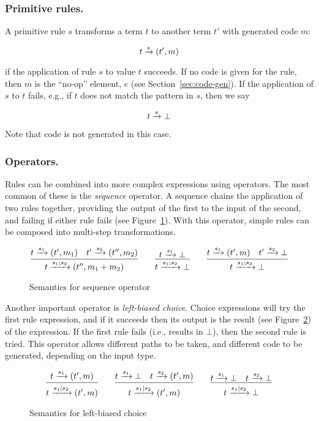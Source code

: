 \subsubsection{Primitive rules.}

A primitive rule $s$ transforms a term $t$ to another term $t'$ with generated code $m$:

\[
t \xrightarrow{s} (t',m)
\]

if the application of rule $s$ to value $t$ succeeds. If no code is given for the rule, then $m$ is the ``no-op'' element, $e$ (see Section~\ref{sec:code-gen}). If the application of $s$ to $t$ fails, e.g., if $t$ does not match the pattern in $s$, then we say

\[
t \xrightarrow{s} \bot
\]

Note that code is not generated in this case.

\subsubsection{Operators.}

Rules can be combined into more complex expressions using operators. The most common of these is the \emph{sequence} operator. A sequence chains the application of two rules together, providing the output of the first to the input of the second, and failing if either rule fails (see Figure~\ref{semantics:sequence}). With this operator, simple rules can be composed into multi-step transformations.

\begin{figure}[ht]
\[
\infer{t \arr{s_1;s_2} (t'',m_1+m_2)}{t \arr{s_1} (t',m_1) \quad t' \arr{s_2} (t'',m_2)}
\qquad 
\infer{t \arr{s_1;s_2} \bot}{t \arr{s_1} \bot}
\qquad
\infer{t \arr{s_1;s_2} \bot}{t \arr{s_1} (t',m) \quad t' \arr{s_2} \bot}
\]
\caption{Semantics for sequence operator}
\label{semantics:sequence}
\end{figure}

Another important operator is \emph{left-biased choice}. Choice expressions will try the first rule expression, and if it succeeds then its output is the result (see Figure~\ref{semantics:choice}) of the expression. If the first rule fails (i.e., results in $\bot$), then the second rule is tried. This operator allows different paths to be taken, and different code to be generated, depending on the input type.

\begin{figure}[ht]
\[
\infer{t \arr{s_1|s_2} (t',m)}{t \arr{s_1} (t',m)}
\qquad 
\infer{t \arr{s_1|s_2} (t',m)}{t \arr{s_1} \bot \quad t \arr{s_2} (t',m)}
\qquad
\infer{t \arr{s_1|s_2} \bot}{t \arr{s_1} \bot \quad t \arr{s_2} \bot}
\]
\caption{Semantics for left-biased choice}
\label{semantics:choice}
\end{figure}

